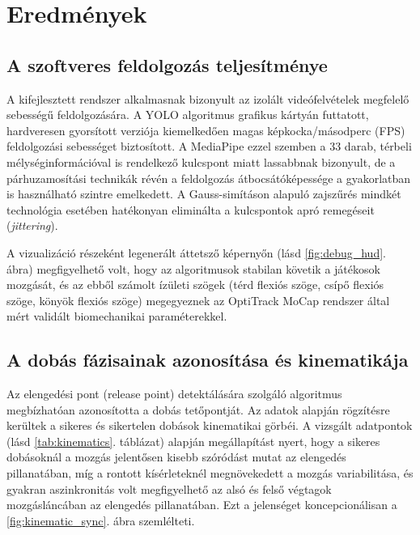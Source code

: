 \chapter{Eredmények}
\label{ch:eredmenyek}

\section{A szoftveres feldolgozás teljesítménye}
A kifejlesztett rendszer alkalmasnak bizonyult az izolált videófelvételek megfelelő sebességű feldolgozására. A YOLO algoritmus grafikus kártyán futtatott, hardveresen gyorsított verziója kiemelkedően magas képkocka/másodperc (FPS) feldolgozási sebességet biztosított. A MediaPipe ezzel szemben a 33 darab, térbeli mélységinformációval is rendelkező kulcspont miatt lassabbnak bizonyult, de a párhuzamosítási technikák révén a feldolgozás átbocsátóképessége a gyakorlatban is használható szintre emelkedett. A Gauss-simításon alapuló zajszűrés mindkét technológia esetében hatékonyan eliminálta a kulcspontok apró remegéseit (\textit{jittering}).

A vizualizáció részeként legenerált áttetsző képernyőn (lásd \ref{fig:debug_hud}. ábra) megfigyelhető volt, hogy az algoritmusok stabilan követik a játékosok mozgását, és az ebből számolt ízületi szögek (térd flexiós szöge, csípő flexiós szöge, könyök flexiós szöge) megegyeznek az OptiTrack MoCap rendszer által mért validált biomechanikai paraméterekkel.

\section{A dobás fázisainak azonosítása és kinematikája}
Az elengedési pont (release point) detektálására szolgáló algoritmus megbízhatóan azonosította a dobás tetőpontját. Az adatok alapján rögzítésre kerültek a sikeres és sikertelen dobások kinematikai görbéi. A vizsgált adatpontok (lásd \ref{tab:kinematics}. táblázat) alapján megállapítást nyert, hogy a sikeres dobásoknál a mozgás jelentősen kisebb szóródást mutat az elengedés pillanatában, míg a rontott kísérleteknél megnövekedett a mozgás variabilitása, és gyakran aszinkronitás volt megfigyelhető az alsó és felső végtagok mozgásláncában az elengedés pillanatában. Ezt a jelenséget koncepcionálisan a \ref{fig:kinematic_sync}. ábra szemlélteti.

